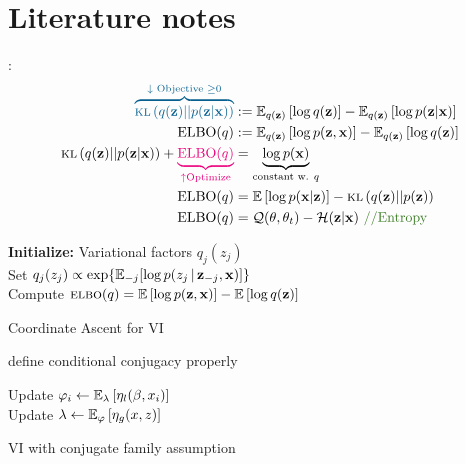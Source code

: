 \section{Literature notes}

: \cite{blei2016variational} \INPROGRESS \\
\begin{align}
  \blue{\overbrace{\kl{q(\bz)||p(\bz|\bx)}}^{\downarrow\text{ Objective } \geq 0} } &:= 
  \EEE{q(\bz)}{\log q(\bz)} - \EEE{q(\bz)}{\log p(\bz | \bx)} \\
  \text{ELBO}(q) &:= \EEE{q(\bz)}{\log p(\bz, \bx)} - \EEE{q(\bz)}{\log q(\bz)} \\
  \kl{q(\bz)||p(\bz|\bx)} + \magenta{\underbrace{\text{ELBO}(q)}_{\uparrow \text{Optimize}}}
    &= \underbrace{\log p(\bx)}_{\text{constant w. } q} \\
    \text{ELBO}(q) &= \EE{\log p(\bx | \bz)} - \kl{q(\bz) || p(\bz)} \\
    \text{ELBO}(q) &= \cQ(\theta, \theta_t) - \mathcal{H}(\bz|\bx) \text{ \comment{ //Entropy}}\\
\end{align}
\begin{algorithm}[h]
  \textbf{Initialize:} Variational factors $q_{j}(z_j)$ \\
   {
     {
      Set $q_{j}(z_j) \propto \exp\{\mathbb{E}_{-j}[\log p(z_j \,\vert\, \mathbf{z}_{-j}, \mathbf{x})]\}$\\
      }
      Compute $\textsc{elbo}(q) = \mathbb{E}\left[\log p(\mathbf{z}, \mathbf{x})\right] - \mathbb{E}\left[\log q(\mathbf{z})\right]$
      }
\caption{Coordinate Ascent for VI}
\label{alg:cavi}
\end{algorithm}
    
 \cite{pgmai18}
\TODO define conditional conjugacy properly
\begin{algorithm}[h]
   {
     {
        Update $\varphi_i \gets \mathbb{E}_{\lambda}\left[\eta_l(\beta, x_i)\right]$\\
      }
      Update $\lambda \gets \mathbb{E}_{\varphi}\left[\eta_g(x, z)\right]$\\
    }
  \caption{VI with conjugate family assumption}
  \label{alg:vi_conj}
\end{algorithm}

